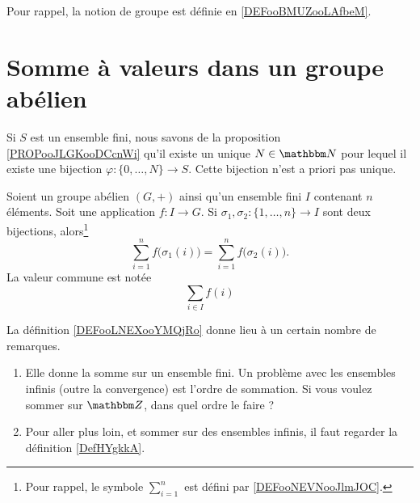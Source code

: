 
\label{CHAPGroupes}

Pour rappel, la notion de groupe est définie en \ref{DEFooBMUZooLAfbeM}.

\section{Somme à valeurs dans un groupe abélien}

Si \( S\) est un ensemble fini, nous savons de la proposition \ref{PROPooJLGKooDCcnWi} qu'il existe un unique \( N\in \eN\) pour lequel il existe une bijection \( \varphi\colon \{ 0,\ldots, N \}\to S\). Cette bijection n'est a priori pas unique.

\begin{lemmaDef}       \label{DEFooLNEXooYMQjRo}
    Soient un groupe abélien \( (G,+)\) ainsi qu'un ensemble fini \( I\) contenant \( n\) éléments. Soit une application \( f\colon I\to G \). Si \( \sigma_1,\sigma_2\colon \{1,\ldots, n \}\to I\) sont deux bijections, alors\footnote{Pour rappel, le symbole \( \sum_{i=1}^n\) est défini par \ref{DEFooNEVNooJlmJOC}.}
    \begin{equation}
        \sum_{i=1}^nf\big( \sigma_1(i) \big)=\sum_{i=1}^nf\big( \sigma_2(i) \big).
    \end{equation}
    La valeur commune est notée
    \begin{equation}
        \sum_{i\in I}f(i)
    \end{equation}
\end{lemmaDef}

La définition \ref{DEFooLNEXooYMQjRo} donne lieu à un certain nombre de remarques.
\begin{enumerate}
    \item
        Elle donne la somme sur un ensemble fini. Un problème avec les ensembles infinis (outre la convergence) est l'ordre de sommation. Si vous voulez sommer sur \( \eZ\), dans quel ordre le faire ?
    \item
        Pour aller plus loin, et sommer sur des ensembles infinis, il faut regarder la définition \ref{DefHYgkkA}. 
\end{enumerate}

